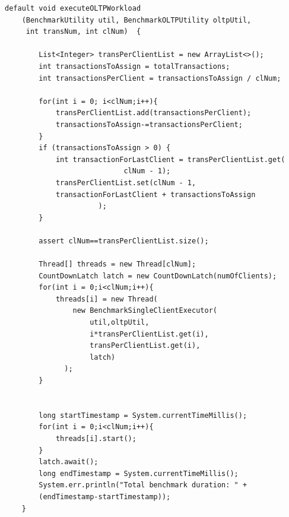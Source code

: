 \documentclass[12pt,oneside]{memoir}
\begin{document}
\begin{lstlisting}[title={OLTPBenchmarkExecutor.java},captionpos=t]
default void executeOLTPWorkload
    (BenchmarkUtility util, BenchmarkOLTPUtility oltpUtil, 
     int transNum, int clNum)  {

        List<Integer> transPerClientList = new ArrayList<>();
        int transactionsToAssign = totalTransactions;
        int transactionsPerClient = transactionsToAssign / clNum;

        for(int i = 0; i<clNum;i++){
            transPerClientList.add(transactionsPerClient);
            transactionsToAssign-=transactionsPerClient;
        }
        if (transactionsToAssign > 0) {
            int transactionForLastClient = transPerClientList.get(
							clNum - 1);
            transPerClientList.set(clNum - 1, 
			transactionForLastClient + transactionsToAssign
					  );
        }

        assert clNum==transPerClientList.size();

        Thread[] threads = new Thread[clNum];
        CountDownLatch latch = new CountDownLatch(numOfClients);
        for(int i = 0;i<clNum;i++){
            threads[i] = new Thread(
				new BenchmarkSingleClientExecutor(
					util,oltpUtil,
					i*transPerClientList.get(i),
					transPerClientList.get(i),
					latch)
			  );
        }


        long startTimestamp = System.currentTimeMillis();
        for(int i = 0;i<clNum;i++){
            threads[i].start();
        }
        latch.await();
        long endTimestamp = System.currentTimeMillis();
        System.err.println("Total benchmark duration: " + 
		(endTimestamp-startTimestamp));
    }
\end{lstlisting}

\end{document}
